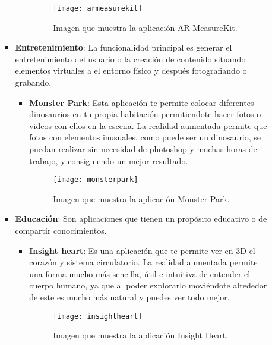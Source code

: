 \begin{itemize}
\begin{itemize}
\begin{itemize}
\begin{itemize}
    \begin{figure}[h]
      \centering
      \texttt{[image: armeasurekit]}
      \caption{Imagen que muestra la aplicación AR MeasureKit.\protect\footnotemark}
      \label{figura-ar-measurekit}
    \end{figure}

  \end{itemize}

  \item \textbf{Entretenimiento}: La funcionalidad principal es generar el entretenimiento del usuario o la creación de contenido situando elementos virtuales a el entorno físico y después fotografiando o grabando.

  \begin{itemize}
    \item \textbf{Monster Park}: Esta aplicación te permite colocar diferentes dinosaurios en tu propia habitación permitiendote hacer fotos o videos con ellos en la escena. La realidad aumentada permite que fotos con elementos inusuales, como puede ser un dinosaurio, se puedan realizar sin necesidad de photoshop y muchas horas de trabajo, y consiguiendo un mejor resultado.

    \begin{figure}[h]
      \centering
      \texttt{[image: monsterpark]}
      \caption{Imagen que muestra la aplicación Monster Park.\protect\footnotemark}
      \label{figura-monster-park}
    \end{figure}

  \end{itemize}

  \item \textbf{Educación}: Son aplicaciones que tienen un propósito educativo o de compartir conocimientos.

  \begin{itemize}
    \item \textbf{Insight heart}: Es una aplicación que te permite ver en 3D el corazón y sistema circulatorio. La realidad aumentada permite una forma mucho más sencilla, útil e intuitiva de entender el cuerpo humano, ya que al poder explorarlo moviéndote alrededor de este es mucho más natural y puedes ver todo mejor.

    \begin{figure}[h]
      \centering
      \texttt{[image: insightheart]}
      \caption{Imagen que muestra la aplicación Insight Heart.\protect\footnotemark}
      \label{figura-insight-heart}
    \end{figure}


\end{itemize}
\end{itemize}
\end{itemize}
\end{itemize}
